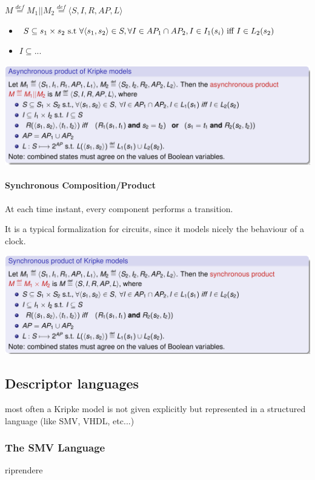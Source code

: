 \documentclass{article}
\begin{document}
$M\overset{def}= M_1||M_2\overset{def}= \langle S,I,R,AP,L\rangle$
\begin{itemize}
    \item $S \subseteq s_1\times s_2 \text{ s.t } \forall\langle s_1,s_2\rangle \in S, \forall I \in AP_1\cap AP_2, I\in I_1(s_i) \text{ iff } I \in L_2(s_2)$
    \item $I \subseteq ...$
\end{itemize}
\begin{center}
    \includegraphics[width=1\linewidth]{images/async_prod.png}
\end{center}

\paragraph{Synchronous Composition/Product} At each time instant, every component performs a transition.

It is a typical formalization for circuits, since it models nicely the behaviour of a clock.
\begin{center}
    \includegraphics[width=1\linewidth]{images/sync_prod.png}
\end{center}

\subsection{Descriptor languages}
most often a Kripke model is not given explicitly but represented in a structured language (like SMV, VHDL, etc...)

\subsubsection{The SMV Language}
\begin{callout}{riprendere}\end{callout}
\end{document}
